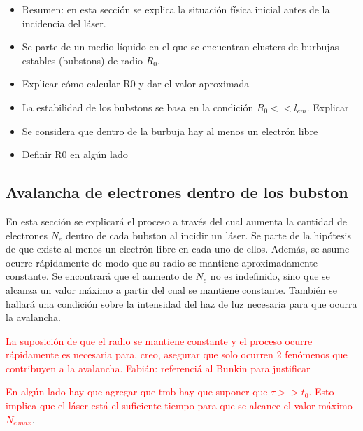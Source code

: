 \documentclass[aps,prb,twocolumn,superscriptaddress,floatfix,longbibliography,10pt]{revtex4-2}
\newif\ifptitle
\newif\ifpnumber
\newcounter{para}
\newcommand\ptitle[1]{\par\refstepcounter{para}
{\ifpnumber{\noindent\textcolor{lightgray}{\textbf{\thepara}}\indent}\fi}
{\ifptitle{\textbf{[{#1}]}}\fi}}
\begin{document}
\ptitle{Situación física inicial}
\begin{itemize}
  \item Resumen: en esta sección se explica la situación física inicial antes de la incidencia del láser.
  \item Se parte de un medio líquido en el que se encuentran clusters de burbujas estables (bubstons) de radio $R_0$.
  \item Explicar cómo calcular R0 y dar el valor aproximada
  \item La estabilidad de los bubstons se basa en la condición $R_0 << l_{em}$. Explicar
  \item Se considera que dentro de la burbuja hay al menos un electrón libre
  \item Definir R0 en algún lado
\end{itemize}



\subsection{Avalancha de electrones dentro de los bubston}

En esta sección se explicará el proceso a través del cual aumenta la cantidad de electrones $N_e$ dentro de cada bubston al incidir un láser. Se parte de la hipótesis de que existe al menos un electrón libre en cada uno de ellos. Además, se asume ocurre rápidamente de modo que su radio se mantiene aproximadamente constante. Se encontrará que el aumento de $N_e$ no es indefinido, sino que se alcanza un valor máximo a partir del cual se mantiene constante. También se hallará una condición sobre la intensidad del haz de luz necesaria para que ocurra la avalancha.

\textcolor{red}{La suposición de que el radio se mantiene constante y el proceso ocurre rápidamente es necesaria para, creo, asegurar que solo ocurren 2 fenómenos que contribuyen a la avalancha. Fabián: referenciá al Bunkin para justificar}

\textcolor{red}{En algún lado hay que agregar que tmb hay que suponer que $\tau >> t_0$. Esto implica que el láser está el suficiente tiempo para que se alcance el valor máximo $N_{e \, max}$}.

\ptitle{La avalancha comienza con un electrón dentro de la burbuja inmerso en el campo electromagnético producido por el láser}
\end{document}
